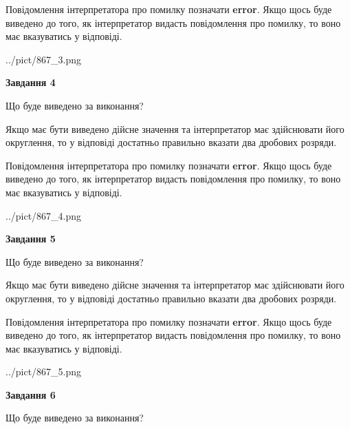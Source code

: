 \documentclass[12pt, ukrainian]{article}
\begin{document}
{\begin {Large}
Повідомлення інтерпретатора про помилку позначати \textbf{error}.
Якщо щось буде виведено до того, як інтерпретатор видасть повідомлення про помилку, 
то воно має вказуватись у відповіді. \par

\begin{center}
	{../pict/867_3.png}
\end{center}
\newpage

{\begin {center}\textbf{Завдання 4}\end {center}}\par
Що буде виведено за виконання? \par

Якщо має бути виведено дійсне значення та інтерпретатор має здійснювати його округлення, 
то у відповіді достатньо правильно вказати два дробових розряди.

Повідомлення інтерпретатора про помилку позначати \textbf{error}.
Якщо щось буде виведено до того, як інтерпретатор видасть повідомлення про помилку, 
то воно має вказуватись у відповіді. \par

\begin{center}
	{../pict/867_4.png}
\end{center}
\newpage

{\begin {center}\textbf{Завдання 5}\end {center}}\par
Що буде виведено за виконання? \par

Якщо має бути виведено дійсне значення та інтерпретатор має здійснювати його округлення, 
то у відповіді достатньо правильно вказати два дробових розряди.

Повідомлення інтерпретатора про помилку позначати \textbf{error}.
Якщо щось буде виведено до того, як інтерпретатор видасть повідомлення про помилку, 
то воно має вказуватись у відповіді. \par

\begin{center}
	{../pict/867_5.png}
\end{center}
\newpage

{\begin {center}\textbf{Завдання 6}\end {center}}\par
Що буде виведено за виконання? \par


\end{Large}}
\end{document}
